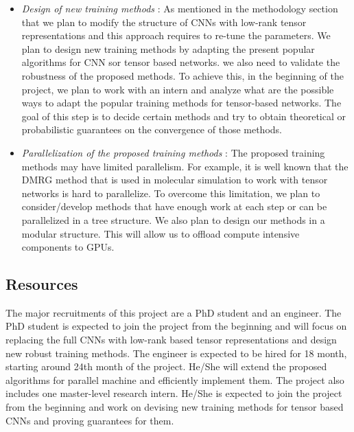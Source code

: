 \begin{itemize}
	\item \emph{Design of new training methods} : As mentioned in the methodology section that we plan to modify the structure of CNNs with low-rank tensor representations and this approach requires to re-tune the parameters. We plan to design new training methods by adapting the present popular algorithms for CNN sor tensor based networks. we also need to validate the robustness of the proposed methods. To achieve this, in the beginning of the project, we plan to work with an intern and analyze what are the possible ways to adapt the popular training methods for tensor-based networks. The goal of this step is to decide certain methods and try to obtain theoretical or probabilistic guarantees on the convergence of those methods.
	
	\item \emph{Parallelization of the proposed training methods} : The proposed training methods may have limited parallelism. For example, it is well known that the DMRG method that is used in molecular simulation to work with tensor networks is hard to parallelize. To overcome this limitation, we plan to consider/develop methods that have enough work at each step or can be parallelized in a tree structure. We also plan to design our methods in a modular structure. This will allow us to offload compute intensive components to GPUs.        
\end{itemize}


\subsection*{Resources}
%
%


The major recruitments of this project are a PhD student and an engineer. The PhD student is expected to join the project from the beginning and  will focus on replacing the full CNNs  with low-rank based tensor representations and design new robust training methods. The engineer is expected to be hired for 18 month, starting around 24th month of the project. He/She will extend the proposed algorithms for parallel machine and efficiently implement them. The project also includes one master-level research intern. He/She is expected to join the project from the beginning and work on devising new training methods for tensor based CNNs and proving guarantees for them.

